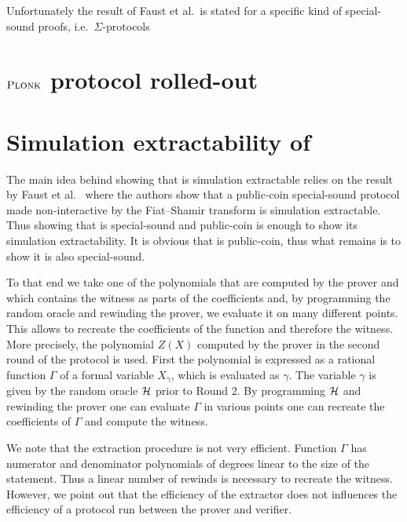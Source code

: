 \documentclass[runningheads]{llncs}
\theoremstyle{definition}
\begin{document}
Unfortunately the result of Faust et al.~is stated for a specific kind of special-sound proofs, i.e.~$\Sigma$-protocols 

\section{$\textsc{Plonk}$ protocol rolled-out}
\section{Simulation extractability of \plonk}
The main idea behind showing that \plonk{} is simulation extractable relies on the result by Faust et al.~\cite{INDOCRYPT:FKMV12} where the authors show that a public-coin special-sound protocol made non-interactive by the Fiat--Shamir transform is simulation extractable.
Thus showing that \plonk{} is special-sound and public-coin is enough to show its simulation extractability. It is obvious that \plonk{} is public-coin, thus what remains is to show it is also special-sound.

To that end we take one of the polynomials that are computed by the prover and which contains the witness as parts of the coefficients and, by programming the random oracle and rewinding the prover, we evaluate it on many different points. This allows to recreate the coefficients of the function and therefore the witness.  
%
More precisely, the polynomial $Z(X)$ computed by the prover in the second round of the protocol is used. First the polynomial is expressed as a rational function $\Gamma$ of a formal variable $X_\gamma$, which is evaluated as $\gamma$. 
The variable $\gamma$ is given by the random oracle $\mathcal{H}$ prior to Round 2. 
By programming $\mathcal{H}$ and rewinding the prover one can evaluate $\Gamma$ in various points one can recreate the coefficients of $\Gamma$ and compute the witness. 

We note that the extraction procedure is not very efficient. Function $\Gamma$ has numerator and denominator polynomials of degrees linear to the size of the statement. Thus a linear number of rewinds is necessary to recreate the witness.
However, we point out that the efficiency of the extractor does not influences the efficiency of a protocol run between the prover and verifier.
\end{document}
